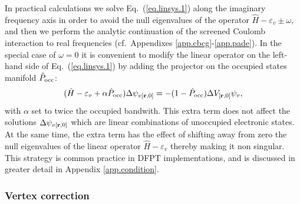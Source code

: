 \documentclass[twocolumn,prb,showpacs,superscriptaddress]{revtex4}
\def\w{\omega}
\def\H{\hat{H}}
\def\P{\hat{P}_{\rm occ}}
\def\E{\varepsilon}
\def\r{{\bf r}}
\begin{document}
In practical calculations we solve Eq.\ (\ref{eq.linsys.1}) along the imaginary
frequency axis in order to avoid the null eigenvalues of the operator
$\H-\E_v\pm\w$, and then we perform the analytic continuation of 
the screened Coulomb interaction to real frequencies (cf.\ Appendixes \ref{app.cbcg}-\ref{app.pade}).
In the special case of $\w=0$ it is convenient to modify the linear operator on the left-hand side of
Eq.\ (\ref{eq.linsys.1}) by adding the projector on the occupied states manifold $\P$:
 \begin{equation} \label{eq.linsys.1b}
 (\H-\E_v+\alpha\P) \Delta \psi_{v[\r,0]}  = -(1-\P)  \Delta V_{[\r,0]} \psi_v,
  \end{equation}
with $\alpha$ set to twice the occupied bandwith. This extra term does not affect
the solutions $\Delta \psi_{v[\r,0]}$ which are linear combinations
of unoccupied electronic states. At the same time, the extra term
has the effect of shifting away from zero the null eigenvalues 
of the linear operator $\H-\E_v$ thereby making it non singular.
This strategy is common practice in DFPT implementations,\cite{baroni.rmp,espresso} and
is discussed in greater detail in Appendix \ref{app.condition}.

\subsubsection{Vertex correction}\label{sec.vertex}
\end{document}
